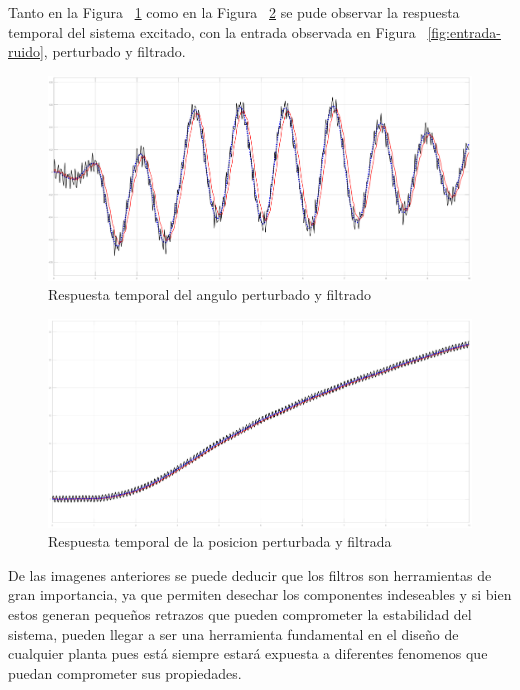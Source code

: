 Tanto en la Figura ~\ref{fig:filtro-angle} como en la Figura ~\ref{fig:filtro-c} se pude observar la
respuesta temporal del sistema excitado, con la entrada observada
en Figura ~\ref{fig:entrada-ruido}, perturbado y filtrado.

\begin{figure}[t]
  \label{fig:filtro-angle}
  \includegraphics[scale=0.15]{Figuras/filtro-angle}
  \caption{Respuesta temporal del angulo perturbado y filtrado} 
\end{figure}

\begin{figure}[t]
  \label{fig:filtro-c}
  \includegraphics[scale=0.15]{Figuras/filtro-c}
  \caption{Respuesta temporal de la posicion perturbada y filtrada} 
\end{figure}

De las imagenes anteriores se puede deducir que los filtros son herramientas de gran importancia, ya que
permiten desechar los componentes indeseables y si bien estos generan pequeños retrazos que pueden comprometer
la estabilidad del sistema, pueden llegar a ser una herramienta fundamental en el diseño de cualquier planta
pues está siempre estará expuesta a diferentes fenomenos que puedan comprometer sus propiedades.